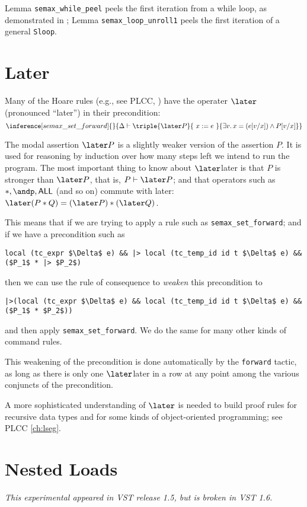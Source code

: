 \documentclass[12pt,fleqn,openany,oneside,showtrims]{memoir}
\newcommand{\ychapter}[2]{\chapter[#1]{#1}}
\begin{document}
Lemma \lstinline{semax_while_peel} peels the first iteration from a while loop, as demonstrated in ;
Lemma \lstinline{semax_loop_unroll1} peels the first iteration of a general \lstinline{Sloop}.

\ychapter{Later}{(See PLCC \autoref{ch:stepindex})}
Many of the Hoare rules (e.g., see PLCC, )
have the operater $\later$ (pronounced ``later'') in their precondition:
\[\inference[semax\_set\_forward]{}{
\Delta\vdash\triple{\later P}{~x:=e~}{\exists v.\,x=(e[v/x])\wedge P[v/x]}
}\label{rule:semax-set-forward}\]

The modal assertion $\later P$ is a slightly weaker version of the
assertion $P$.  It is used for reasoning by induction over how many
steps left we intend to run the program.  The most important
thing to know about $\later$later is that $P$ is stronger than
$\later P$, that is, $P \vdash \later P$; and that operators such
as $*, \andp, \mathsf{ALL}$ (and so on) commute with later:
$\later (P*Q)= (\later P) * (\later Q)$.

This means that if we are trying to apply a rule such as
\lstinline{semax_set_forward}; and if we
have a precondition such as
\begin{lstlisting}
local (tc_expr $\Delta$ e) && |> local (tc_temp_id id t $\Delta$ e) && ($P_1$ * |> $P_2$)
\end{lstlisting}
then we can use the rule of consequence to \emph{weaken}
this precondition to
\begin{lstlisting}
|>(local (tc_expr $\Delta$ e) && local (tc_temp_id id t $\Delta$ e) && ($P_1$ * $P_2$))
\end{lstlisting}
and then apply \lstinline{semax_set_forward}.  We do the same for many other kinds of command rules.

This weakening of the precondition is done automatically by the
\lstinline{forward} tactic, as long as there is only one
$\later$later in a row at any point among the various conjuncts of
the precondition.

A more sophisticated understanding of $\later$ is needed to
build proof rules for recursive data types and for
some kinds of object-oriented programming; see PLCC \autoref{ch:lseg}.

\iffalse



\ychapter{Nested Loads}{}

\emph{This experimental appeared in VST release 1.5, but is broken in VST 1.6.}
\end{document}
